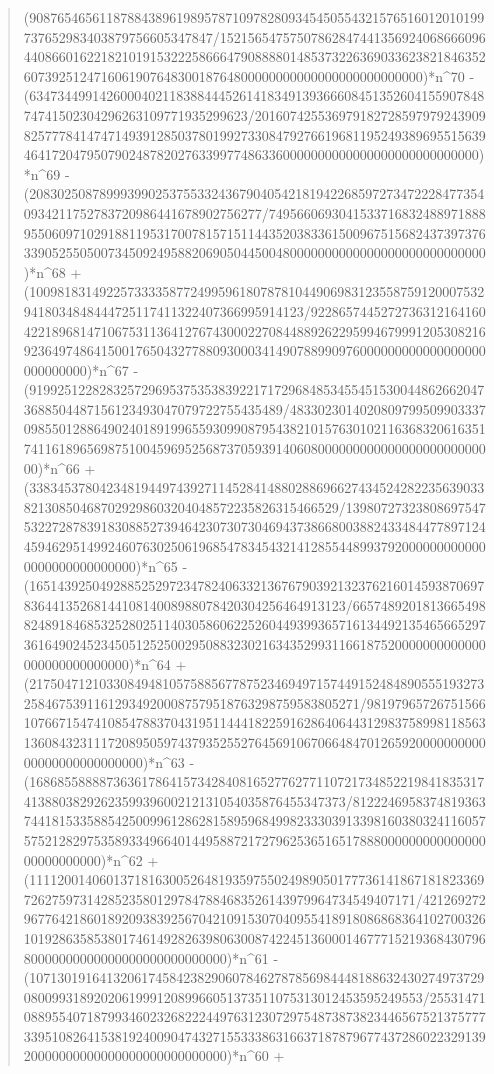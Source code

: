 \documentclass[11pt,a4paper]{article}
\theoremstyle{plain}
\theoremstyle{definition}
\begin{document}
\begin{quote}
(90876546561187884389619895787109782809345450554321576516012010199737652983403879756605347847/15215654757507862847441356924068666096440866016221821019153222586664790888801485373226369033623821846352607392512471606190764830018764800000000000000000000000000)*n\^{}70 - (6347344991426000402118388444526141834913936660845135260415590784874741502304296263109771935299623/20160742553697918272859797924390982577784147471493912850378019927330847927661968119524938969551563946417204795079024878202763399774863360000000000000000000000000000)*n\^{}69 - (208302508789993990253755332436790405421819422685972734722284773540934211752783720986441678902756277/7495660693041533716832488971888955060971029188119531700781571511443520383361500967515682437397376339052550500734509249588206905044500480000000000000000000000000000)*n\^{}68 + (100981831492257333358772499596180787810449069831235587591200075329418034848444725117411322407366995914123/9228657445272736312164160422189681471067531136412767430002270844889262295994679991205308216923649748641500176504327788093000341490788990976000000000000000000000000000)*n\^{}67 - (919925122828325729695375353839221717296848534554515300448626620473688504487156123493047079722755435489/483302301402080979950990333709855012886490240189199655930990879543821015763010211636832061635174116189656987510045969525687370593914060800000000000000000000000000)*n\^{}66 + (33834537804234819449743927114528414880288696627434524282235639033821308504687029298603204048572235826315466529/139807273238086975475322728783918308852739464230730730469437386680038824334844778971244594629514992460763025061968547834543214128554489937920000000000000000000000000000)*n\^{}65 - (165143925049288525297234782406332136767903921323762160145938706978364413526814410814008988078420304256464913123/6657489201813665498824891846853252802511403058606225260449399365716134492135465665297361649024523450512525002950883230216343529931166187520000000000000000000000000000)*n\^{}64 + (21750471210330849481057588567787523469497157449152484890555193273258467539116129349200087579518763298759583805271/9819796572675156610766715474108547883704319511444182259162864064431298375899811856313608432311172089505974379352552764569106706648470126592000000000000000000000000000)*n\^{}63 - (168685588887363617864157342840816527762771107217348522198418353174138803829262359939600212131054035876455347373/812224695837481936374418153358854250099612862815895968499823330391339816038032411605757521282975358933496640144958872172796253651651788800000000000000000000000000)*n\^{}62 + (1111200140601371816300526481935975502498905017773614186718182336972627597314285235801297847884683526143979964734549407171/42126927296776421860189209383925670421091530704095541891808686836410270032610192863585380174614928263980630087422451360001467771521936843079680000000000000000000000000000)*n\^{}61 - (10713019164132061745842382906078462787856984448188632430274973729080099318920206199912089966051373511075313012453595249553/2553147108895540718799346023268222449763123072975487387382344656752137577733951082641538192400904743271553338631663718787967743728602232913920000000000000000000000000000)*n\^{}60 + 
\end{quote}
\end{document}
